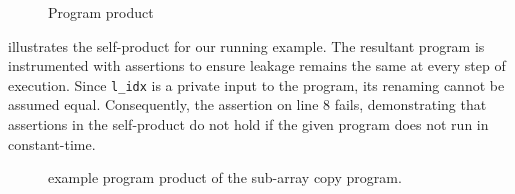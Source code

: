\begin{figure}[h]
    \centering
    \label{fig:fig_7}
    \label{fig:fig_8}
    \caption{Program product}
    \label{fig:rules}
\end{figure}

 illustrates the self-product for our running example. 
The resultant program is instrumented with assertions to ensure leakage remains the same at
every step of execution.
Since \texttt{l\_idx} is a private input to the program, its renaming cannot be assumed equal.
Consequently, the assertion on line $8$ fails, demonstrating that assertions in the self-product do not hold if the given program does not run in constant-time.

\begin{figure}[h]
    
    \caption{example program product of the sub-array copy program.}
    \label{fig:example_prod}
\end{figure}

